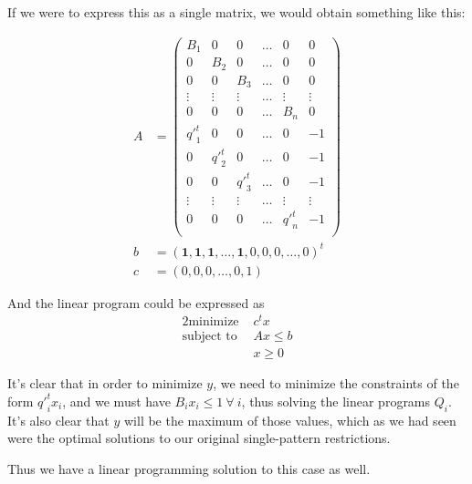 If we were to express this as a single matrix, we would obtain something like this:

\begin{align*}
A &= \begin{pmatrix}
B_1 & 0   & 0   & \dots & 0 & 0\\
0   & B_2 & 0   & \dots & 0 & 0\\
0   & 0   & B_3 & \dots & 0 & 0\\
\vdots & \vdots & \vdots & \dots & \vdots & \vdots\\
0 & 0 & 0 & \dots & B_n & 0\\
{q'}_1^t & 0 & 0 & \dots & 0 & -1\\
0 & {q'}_2^t & 0 & \dots & 0 & -1\\
0 & 0 & {q'}_3^t & \dots & 0 & -1\\
\vdots & \vdots & \vdots & \dots & \vdots & \vdots\\
0 & 0 & 0 & \dots & {q'}_n^t & -1\\
\end{pmatrix}\\
b &= (\mathbf{1}, \mathbf{1}, \mathbf{1}, \dots, \mathbf{1}, 0, 0, 0, \dots, 0)^t\\
c &= (0, 0, 0, \dots, 0, 1)
\end{align*}

And the linear program could be expressed as
\begin{alignat*}{2}
  \text{minimize } & c^t x\\
  \text{subject to } & Ax \le b\\
                     & x \ge 0
\end{alignat*}


It's clear that in order to minimize $y$, we need to minimize the constraints of the form ${q'}_i^t x_i$, and we must have $B_i x_i \le 1\ \forall\ i$, thus solving the linear programs $Q_i$. It's also clear that $y$ will be the maximum of those values, which as we had seen were the optimal solutions to our original single-pattern restrictions.

Thus we have a linear programming solution to this case as well.
